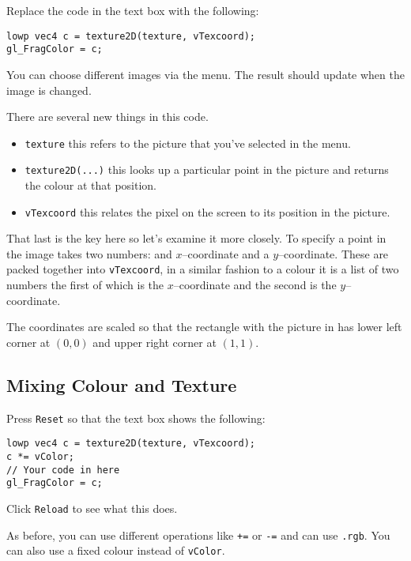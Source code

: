 \documentclass[
  html5,%
  mathml,%
  use filename%
]{internet}
\begin{document}
Replace the code in the text box with the following:

\begin{tcolorbox}
\begin{verbatim}
lowp vec4 c = texture2D(texture, vTexcoord);
gl_FragColor = c;
\end{verbatim}
\end{tcolorbox}

You can choose different images via the menu.
The result should update when the image is changed.

There are several new things in this code.

\begin{itemize}
\item \verb+texture+ this refers to the picture that you've selected in the menu.
\item \verb+texture2D(...)+ this looks up a particular point in the picture and returns the colour at that position.
\item \verb+vTexcoord+ this relates the pixel on the screen to its position in the picture.
\end{itemize}

That last is the key here so let's examine it more closely.
To specify a point in the image takes two numbers: and \(x\)--coordinate and a \(y\)--coordinate.
These are packed together into \verb+vTexcoord+, in a similar fashion to a colour it is a list of two numbers the first of which is the \(x\)--coordinate and the second is the \(y\)--coordinate.

The coordinates are scaled so that the rectangle with the picture in has lower left corner at \((0,0)\) and upper right corner at \((1,1)\).

\subsection{Mixing Colour and Texture}

Press \verb+Reset+ so that the text box shows the following:

\begin{tcolorbox}
\begin{verbatim}
lowp vec4 c = texture2D(texture, vTexcoord);
c *= vColor;
// Your code in here
gl_FragColor = c;
\end{verbatim}
\end{tcolorbox}

Click \verb+Reload+ to see what this does.

As before, you can use different operations like \verb!+=! or \verb!-=! and can use \verb!.rgb!.
You can also use a fixed colour instead of \verb!vColor!.
\end{document}
